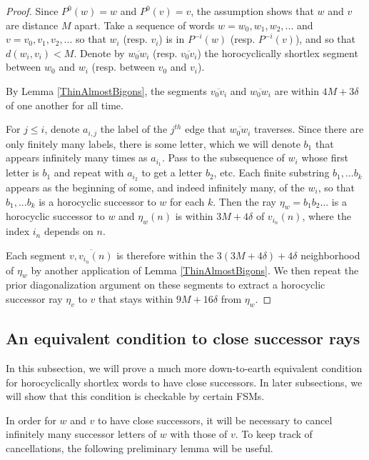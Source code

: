 \documentclass{amsart}
\theoremstyle{definition}
\theoremstyle{remark}
\begin{document}
	\begin{proof}
		
		Since $P^0(w)=w$ and $P^0(v)=v$, the assumption shows that $w$ and $v$ are distance $M$ apart. Take a sequence of words $w=w_0, w_1, w_2,...$ and $v=v_0, v_1, v_2,...$ so that $w_i$ (resp. $v_i$) is in $P^{-i}(w)$ (resp. $P^{-i}(v)$), and so that $d(w_i, v_i)<M$. Denote  by $\overline{w_0w_i}$ (resp. $\overline{v_0v_i}$) the horocyclically shortlex segment between $w_0$ and $w_i$ (resp. between $v_0$ and $v_i$). 
		
		By Lemma \ref{ThinAlmostBigons}, the segments $\overline{v_0v_i}$ and $\overline{w_0w_i}$ are within  $4M+3\delta$ of one another for all time.
		
		For $j\le i$, denote $a_{i,j}$ the label of the $j^{th}$ edge that $\overline{w_0w_i}$ traverses. Since there are only finitely many labels, there is some letter, which we will denote $b_1$ that appears infinitely many times as $a_{i_1}$. Pass to the subsequence of $w_i$ whose first letter is $b_1$ and repeat with $a_{i_2}$ to get a letter $b_2$, etc. Each finite substring $b_1,...b_k$ appears as the beginning of some, and indeed infinitely many, of the $w_i$, so that $b_1,...b_k$ is a horocyclic successor to $w$ for each $k$. Then the ray $\eta_w=b_1b_2...$ is a horocyclic successor to $w$ and $\eta_w(n)$ is within $3M+4\delta$ of $v_{i_n}(n)$, where the index $i_n$ depends on $n$. 
		
		Each segment $\overline{v,v_{i_n}(n)}$ is therefore within the $3(3M+4\delta)+4\delta$ neighborhood of $\eta_w$ by another application of Lemma \ref{ThinAlmostBigons}. We then repeat the prior diagonalization argument on these segments to extract a horocyclic successor ray $\eta_v$ to $v$ that stays within $9M+16\delta$ from $\eta_w$.
	\end{proof}
	
	\subsection{An equivalent condition to close successor rays}
	\label{subsec:CloseSuccessors}
	
	In this subsection, we will prove a much more down-to-earth equivalent condition for horocyclically shortlex words to have close successors. In later subsections, we will show that this condition is checkable by certain FSMs.
	
	In order for $w$ and $v$ to have close successors, it will be necessary to cancel infinitely many successor letters of $w$ with those of $v$. To keep track of cancellations, the following preliminary lemma will be useful.
	
\end{document}
